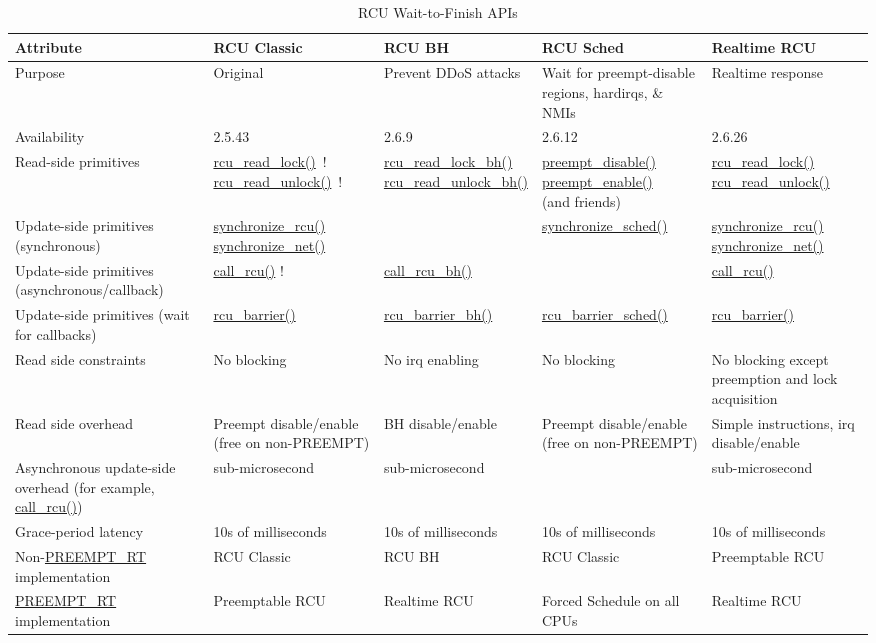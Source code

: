\begin{table*}[p]
\begin{center}
\scriptsize
\begin{tabular}{p{1.1in}|p{1.0in}|p{1.1in}|p{1.0in}|p{0.9in}}
Attribute &
    RCU Classic &
	RCU BH &
	    RCU Sched &
		Realtime RCU \\
\hline
\hline
Purpose &
    Original &
	Prevent DDoS attacks &
	    { \raggedright Wait for preempt-disable regions,
	      hardirqs, \& NMIs } &
	        Realtime response \\
\hline
Availability &
    2.5.43 &
	2.6.9 &
	    2.6.12 &
	        2.6.26 \\
\hline
Read-side primitives &
    { \raggedright
      \url{rcu_read_lock()}~! \\
      \url{rcu_read_unlock()}~! } &
	{ \raggedright
	  \url{rcu_read_lock_bh()} \\
	  \url{rcu_read_unlock_bh()} } &
	    { \raggedright
	      \url{preempt_disable()} \\
	      \url{preempt_enable()} \\
	      (and friends) } &
	        { \raggedright
		  \url{rcu_read_lock()} \\
		  \url{rcu_read_unlock()} } \\
\hline
{ Update-side primitives (synchronous) } &
    { \url{synchronize_rcu()} \url{synchronize_net()} } &
	&
	    \url{synchronize_sched()} &
	        { \url{synchronize_rcu()} \url{synchronize_net()} } \\
\hline
{ Update-side primitives (asynchronous/callback) } &
    \url{call_rcu()} ! &
	\url{call_rcu_bh()} &
	    &
	        \url{call_rcu()} \\
\hline
{ Update-side primitives (wait for callbacks) } &
    \url{rcu_barrier()} &
	\url{rcu_barrier_bh()} &
	    \url{rcu_barrier_sched()} &
	        \url{rcu_barrier()} \\
\hline
Read side constraints &
    No blocking &
	No irq enabling &
	    No blocking &
	        No blocking except preemption and lock acquisition \\
\hline
Read side overhead &
    Preempt disable/enable (free on non-PREEMPT) &
	BH disable/enable &
	    Preempt disable/enable (free on non-PREEMPT) &
	        Simple instructions, irq disable/enable \\
\hline
Asynchronous update-side overhead (for example, \url{call_rcu()}) &
    sub-microsecond &
	sub-microsecond &
	    &
	        sub-microsecond \\
\hline
Grace-period latency &
    10s of milliseconds &
	10s of milliseconds &
	    10s of milliseconds &
	        10s of milliseconds \\
\hline
Non-\url{PREEMPT_RT} implementation &
    RCU Classic &
	RCU BH &
	    RCU Classic &
	        Preemptable RCU \\
\hline
\url{PREEMPT_RT} implementation &
    Preemptable RCU &
	Realtime RCU &
	    Forced Schedule on all CPUs &
	        Realtime RCU \\
\end{tabular}
\end{center}
\caption{RCU Wait-to-Finish APIs}
\label{tab:defer:RCU Wait-to-Finish APIs}
\end{table*}

